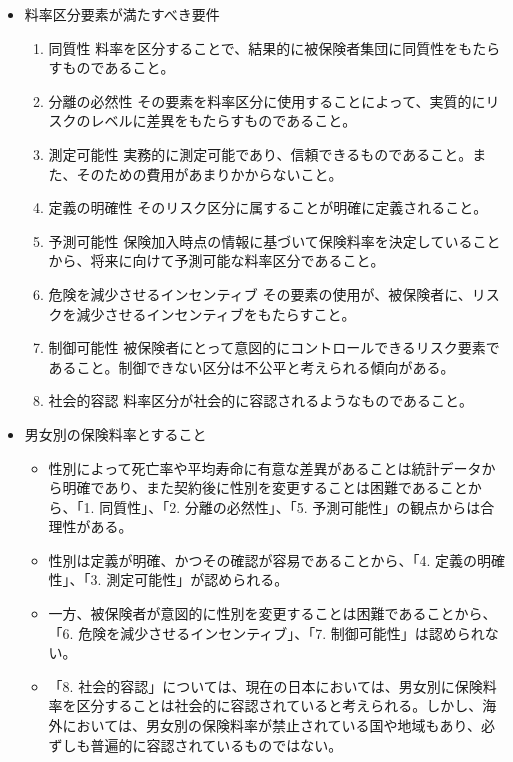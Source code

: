 \documentclass[]{article}
\begin{document}
\begin{itemize}
\tightlist
\item
  料率区分要素が満たすべき要件

  \begin{enumerate}
  \def\labelenumi{\arabic{enumi}.}
  \tightlist
  \item
    同質性
    料率を区分することで、結果的に被保険者集団に同質性をもたらすものであること。
  \item
    分離の必然性
    その要素を料率区分に使用することによって、実質的にリスクのレベルに差異をもたらすものであること。
  \item
    測定可能性
    実務的に測定可能であり、信頼できるものであること。また、そのための費用があまりかからないこと。
  \item
    定義の明確性 そのリスク区分に属することが明確に定義されること。
  \item
    予測可能性
    保険加入時点の情報に基づいて保険料率を決定していることから、将来に向けて予測可能な料率区分であること。
  \item
    危険を減少させるインセンティブ
    その要素の使用が、被保険者に、リスクを減少させるインセンティブをもたらすこと。
  \item
    制御可能性
    被保険者にとって意図的にコントロールできるリスク要素であること。制御できない区分は不公平と考えられる傾向がある。
  \item
    社会的容認 料率区分が社会的に容認されるようなものであること。
  \end{enumerate}
\item
  男女別の保険料率とすること

  \begin{itemize}
  \tightlist
  \item
    性別によって死亡率や平均寿命に有意な差異があることは統計データから明確であり、また契約後に性別を変更することは困難であることから、「1.
    同質性」、「2. 分離の必然性」、「5.
    予測可能性」の観点からは合理性がある。
  \item
    性別は定義が明確、かつその確認が容易であることから、「4.
    定義の明確性」、「3. 測定可能性」が認められる。
  \item
    一方、被保険者が意図的に性別を変更することは困難であることから、「6.
    危険を減少させるインセンティブ」、「7. 制御可能性」は認められない。
  \item
    「8.
    社会的容認」については、現在の日本においては、男女別に保険料率を区分することは社会的に容認されていると考えられる。しかし、海外においては、男女別の保険料率が禁止されている国や地域もあり、必ずしも普遍的に容認されているものではない。
  \end{itemize}
\end{itemize}
\end{document}
